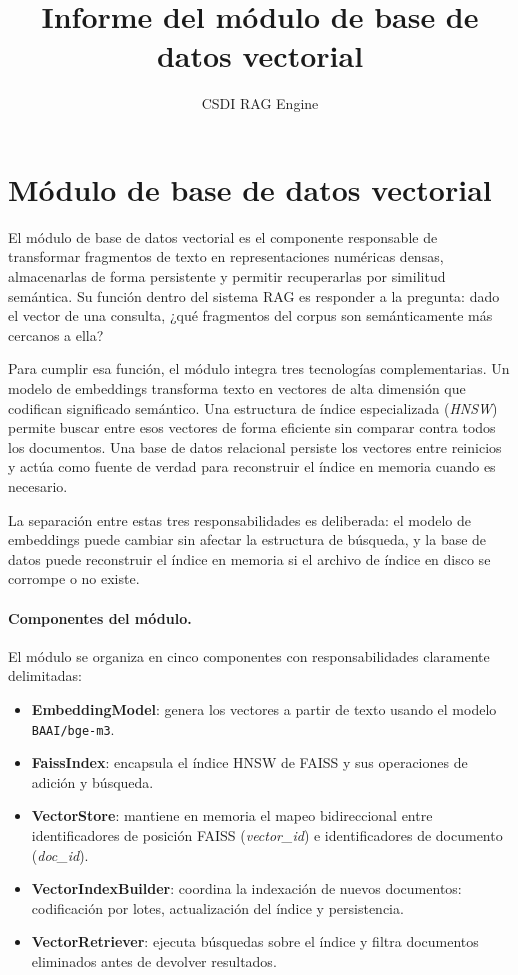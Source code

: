 \documentclass[11pt]{article}
\title{Informe del módulo de base de datos vectorial}
\author{CSDI RAG Engine}
\date{}
\begin{document}
\maketitle

\section{Módulo de base de datos vectorial}

El módulo de base de datos vectorial es el componente responsable de transformar fragmentos
de texto en representaciones numéricas densas, almacenarlas de forma persistente y permitir
recuperarlas por similitud semántica. Su función dentro del sistema RAG es responder a la
pregunta: dado el vector de una consulta, ¿qué fragmentos del corpus son semánticamente más
cercanos a ella?

Para cumplir esa función, el módulo integra tres tecnologías complementarias. Un modelo de
embeddings transforma texto en vectores de alta dimensión que codifican significado semántico.
Una estructura de índice especializada (\emph{HNSW}) permite buscar entre esos vectores de
forma eficiente sin comparar contra todos los documentos. Una base de datos relacional persiste
los vectores entre reinicios y actúa como fuente de verdad para reconstruir el índice en
memoria cuando es necesario.

La separación entre estas tres responsabilidades es deliberada: el modelo de embeddings puede
cambiar sin afectar la estructura de búsqueda, y la base de datos puede reconstruir el índice
en memoria si el archivo de índice en disco se corrompe o no existe.

\paragraph{Componentes del módulo.}
El módulo se organiza en cinco componentes con responsabilidades claramente delimitadas:

\begin{itemize}
\item \textbf{EmbeddingModel}: genera los vectores a partir de texto usando el modelo
      \texttt{BAAI/bge-m3}.
\item \textbf{FaissIndex}: encapsula el índice HNSW de FAISS y sus operaciones de adición y
      búsqueda.
\item \textbf{VectorStore}: mantiene en memoria el mapeo bidireccional entre identificadores
      de posición FAISS (\emph{vector\_id}) e identificadores de documento (\emph{doc\_id}).
\item \textbf{VectorIndexBuilder}: coordina la indexación de nuevos documentos: codificación
      por lotes, actualización del índice y persistencia.
\item \textbf{VectorRetriever}: ejecuta búsquedas sobre el índice y filtra documentos
      eliminados antes de devolver resultados.
\end{itemize}
\end{document}
